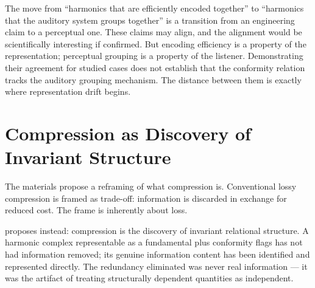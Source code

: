 \begin{dangerzone}
The move from ``harmonics that are efficiently encoded together''
to ``harmonics that the auditory system groups together'' is a
transition from an engineering claim to a perceptual one. These
claims may align, and the alignment would be scientifically
interesting if confirmed. But encoding efficiency is a property
of the representation; perceptual grouping is a property of the
listener. Demonstrating their agreement for studied cases does
not establish that the conformity relation tracks the auditory
grouping mechanism. The distance between them is exactly where
representation drift begins.
\end{dangerzone}

\section{Compression as Discovery of Invariant Structure}
\label{sec:compression-invariant}

The \HCFone{} materials propose a reframing of what compression
is. Conventional lossy compression is framed as trade-off:
information is discarded in exchange for reduced cost.
The frame is inherently about loss.

\HCFone{} proposes instead: compression is the discovery of
invariant relational structure. A harmonic complex representable
as a fundamental plus conformity flags has not had information
removed; its genuine information content has been identified and
represented directly. The redundancy eliminated was never real
information --- it was the artifact of treating structurally
dependent quantities as independent.




